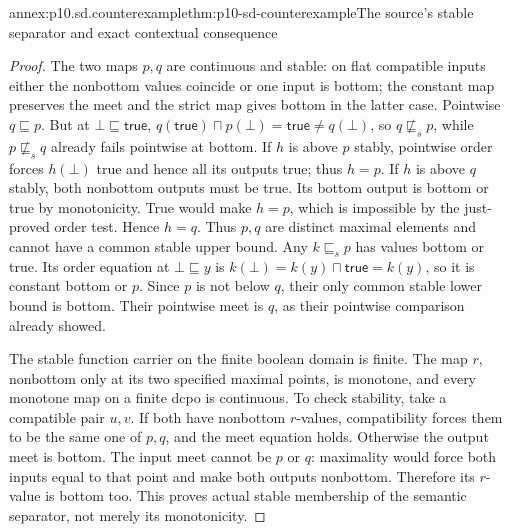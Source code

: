 \begin{annexitem}{annex:p10.sd.counterexample}{thm:p10-sd-counterexample}{The source's stable separator and exact contextual consequence}
\begin{proof}
The two maps \(p,q\) are continuous and stable: on flat compatible
inputs either the nonbottom values coincide or one input is bottom;
the constant map preserves the meet and the strict map gives bottom in
the latter case. Pointwise \(q\sqsubseteq p\). But at
\(\bot\sqsubseteq\mathsf{true}\),
\(q(\mathsf{true})\sqcap p(\bot)=\mathsf{true}\ne q(\bot)\),
so \(q\not\sqsubseteq_s p\), while \(p\not\sqsubseteq_s q\)
already fails pointwise at bottom.
If \(h\) is above \(p\) stably, pointwise order forces \(h(\bot)\)
true and hence all its outputs true; thus \(h=p\).
If \(h\) is above \(q\) stably, both nonbottom outputs must be true.
Its bottom output is bottom or true by monotonicity. True would make
\(h=p\), which is impossible by the just-proved order test. Hence
\(h=q\). Thus \(p,q\) are distinct maximal elements and cannot
have a common stable upper bound.
Any \(k\sqsubseteq_s p\) has values bottom or true. Its order equation
at \(\bot\sqsubseteq y\) is \(k(\bot)=k(y)\sqcap\mathsf{true}=k(y)\),
so it is constant bottom or \(p\). Since \(p\) is not below \(q\),
their only common stable lower bound is bottom. Their pointwise meet is
\(q\), as their pointwise comparison already showed.

The stable function carrier on the finite boolean domain is finite.
The map \(r\), nonbottom only at its two specified maximal points,
is monotone, and every monotone map on a finite dcpo is continuous.
To check stability, take a compatible pair \(u,v\). If both have
nonbottom \(r\)-values, compatibility forces them to be the same one
of \(p,q\), and the meet equation holds. Otherwise the output meet
is bottom. The input meet cannot be \(p\) or \(q\): maximality would
force both inputs equal to that point and make both outputs nonbottom.
Therefore its \(r\)-value is bottom too. This proves actual stable
membership of the semantic separator, not merely its monotonicity.


\end{proof}
\end{annexitem}
